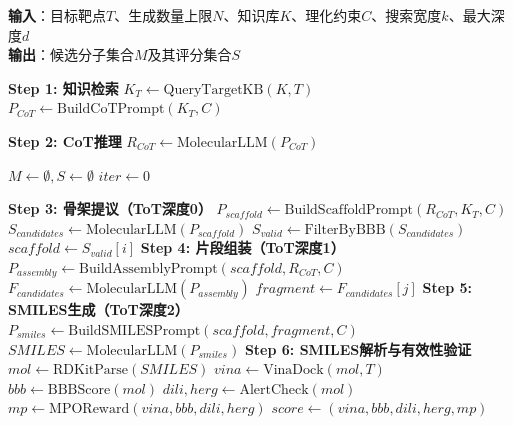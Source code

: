 \begin{algorithm}
\caption{基于CoT-ToT与物理反馈的GBM候选分子生成算法}
\label{alg:cot-tot}
\textbf{输入}：目标靶点$T$、生成数量上限$N$、知识库$K$、理化约束$C$、搜索宽度$k$、最大深度$d$ \\
\textbf{输出}：候选分子集合$M$及其评分集合$S$

\begin{algorithmic}[1]
\State \textbf{Step 1: 知识检索} 
\State $K_T \leftarrow \text{QueryTargetKB}(K, T)$
\State $P_{CoT} \leftarrow \text{BuildCoTPrompt}(K_T, C)$ 

\State \textbf{Step 2: CoT推理} 
\State $R_{CoT} \leftarrow \text{MolecularLLM}(P_{CoT})$ 

\State $M \leftarrow \emptyset, S \leftarrow \emptyset$
\State $iter \leftarrow 0$

    \State \textbf{Step 3: 骨架提议（ToT深度0）}
    \State $P_{scaffold} \leftarrow \text{BuildScaffoldPrompt}(R_{CoT}, K_T, C)$
    \State $S_{candidates} \leftarrow \text{MolecularLLM}(P_{scaffold})$ 
    \State $S_{valid} \leftarrow \text{FilterByBBB}(S_{candidates})$ 
        \State $scaffold \leftarrow S_{valid}[i]$
        \State \textbf{Step 4: 片段组装（ToT深度1）}
        \State $P_{assembly} \leftarrow \text{BuildAssemblyPrompt}(scaffold, R_{CoT}, C)$
        \State $F_{candidates} \leftarrow \text{MolecularLLM}(P_{assembly})$ 
            \State $fragment \leftarrow F_{candidates}[j]$
            \State \textbf{Step 5: SMILES生成（ToT深度2）}
            \State $P_{smiles} \leftarrow \text{BuildSMILESPrompt}(scaffold, fragment, C)$
            \State $SMILES \leftarrow \text{MolecularLLM}(P_{smiles})$
            \State \textbf{Step 6: SMILES解析与有效性验证}
            \State $mol \leftarrow \text{RDKitParse}(SMILES)$
                \State {}
                \State $vina \leftarrow \text{VinaDock}(mol, T)$ 
                \State $bbb \leftarrow \text{BBBScore}(mol)$ 
                \State $dili, herg \leftarrow \text{AlertCheck}(mol)$ 
                \State $mp \leftarrow \text{MPOReward}(vina, bbb, dili, herg)$ 
                \State $score \leftarrow (vina, bbb, dili, herg, mp)$


\end{algorithmic}
\end{algorithm}
